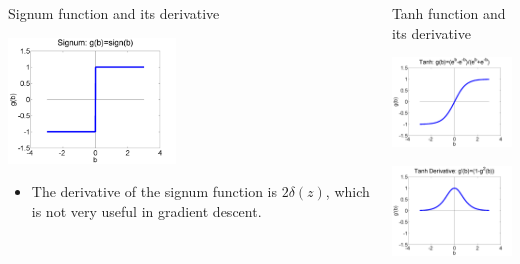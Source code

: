 \documentclass{beamer}
\begin{document}
\begin{frame}
  \begin{columns}[t]
    \column{2.25in}
    \begin{block}{Signum function and its derivative}
      \centerline{\includegraphics[width=1.75in]{figs/nn_signum.png}}
      \begin{itemize}
      \item The derivative of the signum function is $2\delta(z)$,
         which is not very useful in gradient descent.
      \end{itemize}
    \end{block}
    \column{2.25in}
    \begin{block}{Tanh function and its derivative}
      \centerline{\includegraphics[width=1.75in]{figs/nn_tanh.png}}
      \centerline{\includegraphics[width=1.75in]{figs/nn_tanhprime.png}}
    \end{block}
  \end{columns}
\end{frame}
\end{document}
